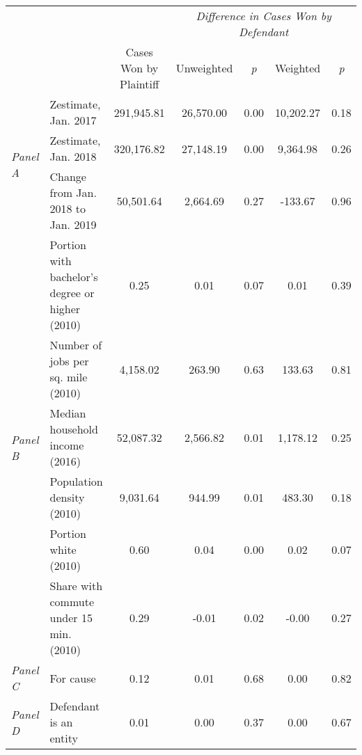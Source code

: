 \begin{tabular}{llccccc}
\toprule
 &  & \textit{} & \multicolumn{4}{c}{\textit{Difference in Cases Won by Defendant}} \\ 
 &  & Cases Won by Plaintiff & Unweighted & \emph{p} & Weighted & \emph{p} \\
\midrule
\multirow[c]{3}{3cm}{\textit{Panel A}} & Zestimate, Jan. 2017 & 291,945.81 & 26,570.00 & 0.00 & 10,202.27 & 0.18 \\
 & Zestimate, Jan. 2018 & 320,176.82 & 27,148.19 & 0.00 & 9,364.98 & 0.26 \\
 & Change from Jan. 2018 to Jan. 2019 & 50,501.64 & 2,664.69 & 0.27 & -133.67 & 0.96 \\
\cline{1-7}
\multirow[c]{6}{3cm}{\textit{Panel B}} & Portion with bachelor's degree or higher (2010) & 0.25 & 0.01 & 0.07 & 0.01 & 0.39 \\
 & Number of jobs per sq. mile (2010) & 4,158.02 & 263.90 & 0.63 & 133.63 & 0.81 \\
 & Median household income (2016) & 52,087.32 & 2,566.82 & 0.01 & 1,178.12 & 0.25 \\
 & Population density (2010) & 9,031.64 & 944.99 & 0.01 & 483.30 & 0.18 \\
 & Portion white (2010) & 0.60 & 0.04 & 0.00 & 0.02 & 0.07 \\
 & Share with commute under 15 min. (2010) & 0.29 & -0.01 & 0.02 & -0.00 & 0.27 \\
\cline{1-7}
\textit{Panel C} & For cause & 0.12 & 0.01 & 0.68 & 0.00 & 0.82 \\
\cline{1-7}
\textit{Panel D} & Defendant is an entity & 0.01 & 0.00 & 0.37 & 0.00 & 0.67 \\
\cline{1-7}
\bottomrule
\end{tabular}
